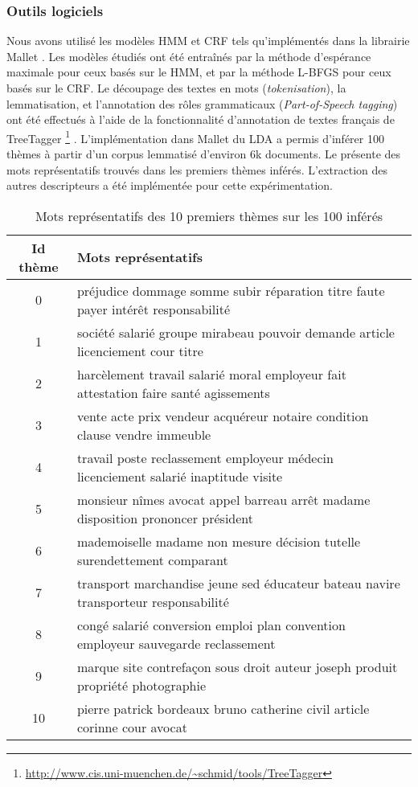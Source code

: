\subsubsection{Outils logiciels}
Nous avons utilisé les modèles HMM et CRF tels qu'implémentés dans la librairie Mallet \citep{McCallum2012Mallet}. Les modèles étudiés ont été entraînés par la méthode d'espérance maximale pour ceux basés sur le HMM, et par la méthode L-BFGS pour ceux basés sur le CRF. Le découpage des textes en mots (\textit{tokenisation}), la lemmatisation, et l'annotation des rôles grammaticaux (\textit{Part-of-Speech tagging}) ont été effectués à l'aide de la fonctionnalité d'annotation de textes français de TreeTagger \footnote{\url{http://www.cis.uni-muenchen.de/~schmid/tools/TreeTagger}}  \citep{schmid1994treetagger}. L'implémentation dans Mallet du LDA \citep{blei2003lda} a permis d'inférer 100 thèmes à partir d'un corpus lemmatisé d'environ 6k documents. Le  
présente des mots représentatifs trouvés dans les premiers thèmes inférés. L'extraction des autres descripteurs a été implémentée pour cette expérimentation. 


\begin{table}[!ht]
\small
\begin{center}
\begin{tabular}{c|p{}}
Id thème & Mots représentatifs  \\ \hline
0	& 	préjudice  dommage  somme  subir  réparation  titre  faute  payer  intérêt  responsabilité  \\ \hline
1	& société  salarié  groupe  mirabeau  pouvoir  demande  article  licenciement  cour  titre    \\ \hline
2	& harcèlement  travail  salarié  moral  employeur  fait  attestation  faire  santé  agissements  \\ \hline
3	& vente  acte  prix  vendeur  acquéreur  notaire  condition  clause  vendre  immeuble  \\ \hline
4	& 		travail  poste  reclassement  employeur  médecin  licenciement  salarié  inaptitude  visite  \\ \hline
5	& 	monsieur  nîmes  avocat  appel  barreau  arrêt  madame  disposition  prononcer  président  \\ \hline
6	& 	mademoiselle  madame  non  mesure  décision  tutelle  surendettement  comparant   \\ \hline
7	& transport  marchandise  jeune  sed  éducateur  bateau  navire  transporteur  responsabilité  \\ \hline
8	&congé  salarié  conversion  emploi  plan  convention  employeur  sauvegarde  reclassement  \\ \hline
9	&marque  site  contrefaçon  sous  droit  auteur  joseph  produit  propriété  photographie  \\ \hline
10	&pierre  patrick  bordeaux  bruno  catherine  civil  article  corinne  cour  avocat\\ \hline
\end{tabular}
\end{center}
\caption{Mots représentatifs des 10 premiers thèmes sur les 100 inférés}\label{p4_topics}
\end{table}

